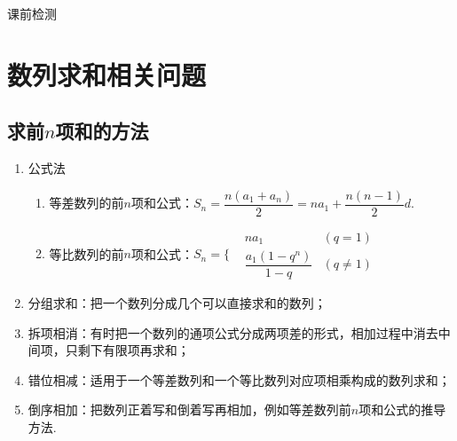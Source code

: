 \Topic{}
  \Teach{}

  \newtheorem*{Theorem}{定理}
  \makefront
\vspace{-1.5em}
\startexercise
\begin{exercise}{\heiti 课前检测}\\

\end{exercise}

\section{数列求和相关问题}
  \subsection{求前$ n $项和的方法}
  \begin{enumerate}
  \item 公式法\begin{enumerate}
  \item 等差数列的前$ n $项和公式：$S_n=\dfrac{n(a_1+a_n)}{2}=na_1+\dfrac{n(n-1)}{2}d$.
  \item 等比数列的前$ n $项和公式：$S_n=\Bigg\{\begin{aligned}
  &na_1&\left(q=1\right)\\
  &\dfrac{a_1\left(1-q^n\right)}{1-q}&\left(q\ne1\right)
  \end{aligned}$
  \end{enumerate}
  \item 分组求和：把一个数列分成几个可以直接求和的数列；
  \item 拆项相消：有时把一个数列的通项公式分成两项差的形式，相加过程中消去中间项，只剩下有限项再求和；
  \item 错位相减：适用于一个等差数列和一个等比数列对应项相乘构成的数列求和；
  \item 倒序相加：把数列正着写和倒着写再相加，例如等差数列前$ n $项和公式的推导方法.
  \end{enumerate}
